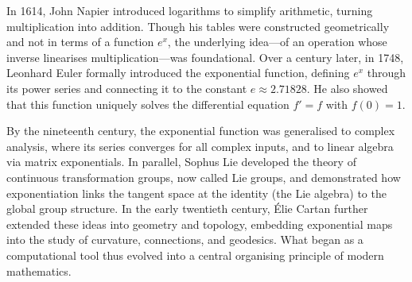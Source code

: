 \begin{historical}
In 1614, John Napier introduced logarithms to simplify arithmetic, turning multiplication into addition. Though his tables were constructed geometrically and not in terms of a function \( e^x \), the underlying idea—of an operation whose inverse linearises multiplication—was foundational. Over a century later, in 1748, Leonhard Euler formally introduced the exponential function, defining \( e^x \) through its power series and connecting it to the constant \( e \approx 2.71828 \). He also showed that this function uniquely solves the differential equation \( f' = f \) with \( f(0) = 1 \).

By the nineteenth century, the exponential function was generalised to complex analysis, where its series converges for all complex inputs, and to linear algebra via matrix exponentials. In parallel, Sophus Lie developed the theory of continuous transformation groups, now called Lie groups, and demonstrated how exponentiation links the tangent space at the identity (the Lie algebra) to the global group structure. In the early twentieth century, Élie Cartan further extended these ideas into geometry and topology, embedding exponential maps into the study of curvature, connections, and geodesics. What began as a computational tool thus evolved into a central organising principle of modern mathematics.
\end{historical}
